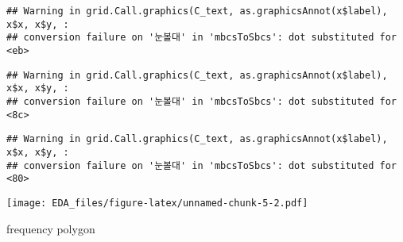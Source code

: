 \documentclass[
]{article}
\begin{document}
\begin{verbatim}
## Warning in grid.Call.graphics(C_text, as.graphicsAnnot(x$label), x$x, x$y, :
## conversion failure on '눈볼대' in 'mbcsToSbcs': dot substituted for <eb>
\end{verbatim}

\begin{verbatim}
## Warning in grid.Call.graphics(C_text, as.graphicsAnnot(x$label), x$x, x$y, :
## conversion failure on '눈볼대' in 'mbcsToSbcs': dot substituted for <8c>
\end{verbatim}

\begin{verbatim}
## Warning in grid.Call.graphics(C_text, as.graphicsAnnot(x$label), x$x, x$y, :
## conversion failure on '눈볼대' in 'mbcsToSbcs': dot substituted for <80>
\end{verbatim}

\texttt{[image: EDA\_files/figure-latex/unnamed-chunk-5-2.pdf]}

frequency polygon
\end{document}
